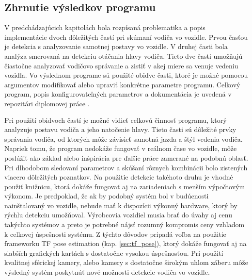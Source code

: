 \documentclass[slovak,master,dept460,male,cpp,cpdeclaration]{diploma}
\begin{document}
\subsection{Zhrnutie výsledkov programu}
V predchádzajúcich kapitolách bola rozpísaná problematika a popis implementácie dvoch dôležitých častí pri skúmaní vodiča vo vozidle. Prvou časťou je detekcia s analyzovanie samotnej postavy vo vozidle. V druhej časti bola analýza smerovaná na detekciu otáčania hlavy vodiča. Tieto dve časti umožňujú čiastočne  analyzovať  vodičovo správanie a zistiť v akej miere sa venuje vedeniu vozidla. Vo výslednom programe sú použité obidve časti, ktoré je možné pomocou argumentov  modifikovať alebo upraviť konkrétne parametre programu. Celkový program, popis konfigurovateľných parametrov a dokumentácia je uvedená v repozitári diplomovej práce \cite{diplomaRepo}.\par
Pri použití obidvoch častí je možné vidieť celkovú činnosť programu, ktorý analyzuje postavu  vodiča a jeho natočenie hlavy. Tieto časti sú dôležité prvky správania vodiča, od ktorých môže závisieť samotná jazda a štýl vedenia vodiča. Napriek tomu, že program nedokáže fungovať v reálnom čase vo vozidle, môže poslúžiť ako základ alebo inšpirácia pre ďalšie práce zamerané na podobnú oblasť.  Pri dlhodobom sledovaní parametrov a skúšaní rôznych kombinácii bolo zistených viacero dôležitých poznatkov. Na použitie detekcie takéhoto druhu je vhodné použiť knižnicu, ktorá dokáže fungovať aj na zariadeniach s menším výpočtovým výkonom. Je predpoklad, že ak by podobný systém bol v budúcnosti nainštalovaný vo vozidle, nebude mať k dispozícii výkonný hardware, ktorý by rýchlu detekciu umožňoval. Výrobcovia vozidiel musia brať do úvahy aj cenu takýchto systémov a preto je potrebné nájsť rozumný kompromis ceny vzhľadom k celkovej úspešnosti systému.  Z týchto dôvodov pripadá voľba na použitie frameworku TF pose estimation (kap. \ref{sec:tf_pose}), ktorý dokáže fungovať aj na slabších grafických kartách s dostatočne vysokou úspešnosťou. Pri použití kvalitnej sférickej kamery, alebo kamery s dostatočne širokým uhlom záberu môže výsledný systém poskytnúť nové možnosti detekcie vodiča vo vozidle.
\end{document}
